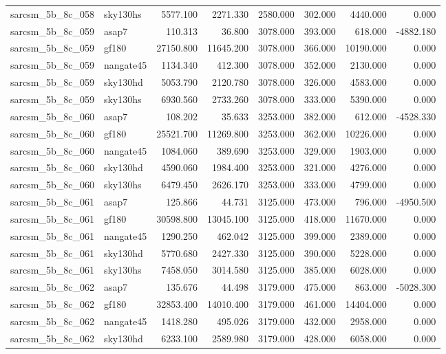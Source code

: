 \begin{tabular}{llrrrrrr}
sarcsm\_5b\_8c\_058 & sky130hs & 5577.100 & 2271.330 & 2580.000 & 302.000 & 4440.000 & 0.000 \\
sarcsm\_5b\_8c\_059 & asap7 & 110.313 & 36.800 & 3078.000 & 393.000 & 618.000 & -4882.180 \\
sarcsm\_5b\_8c\_059 & gf180 & 27150.800 & 11645.200 & 3078.000 & 366.000 & 10190.000 & 0.000 \\
sarcsm\_5b\_8c\_059 & nangate45 & 1134.340 & 412.300 & 3078.000 & 352.000 & 2130.000 & 0.000 \\
sarcsm\_5b\_8c\_059 & sky130hd & 5053.790 & 2120.780 & 3078.000 & 326.000 & 4583.000 & 0.000 \\
sarcsm\_5b\_8c\_059 & sky130hs & 6930.560 & 2733.260 & 3078.000 & 333.000 & 5390.000 & 0.000 \\
sarcsm\_5b\_8c\_060 & asap7 & 108.202 & 35.633 & 3253.000 & 382.000 & 612.000 & -4528.330 \\
sarcsm\_5b\_8c\_060 & gf180 & 25521.700 & 11269.800 & 3253.000 & 362.000 & 10226.000 & 0.000 \\
sarcsm\_5b\_8c\_060 & nangate45 & 1084.060 & 389.690 & 3253.000 & 329.000 & 1903.000 & 0.000 \\
sarcsm\_5b\_8c\_060 & sky130hd & 4590.060 & 1984.400 & 3253.000 & 321.000 & 4276.000 & 0.000 \\
sarcsm\_5b\_8c\_060 & sky130hs & 6479.450 & 2626.170 & 3253.000 & 333.000 & 4799.000 & 0.000 \\
sarcsm\_5b\_8c\_061 & asap7 & 125.866 & 44.731 & 3125.000 & 473.000 & 796.000 & -4950.500 \\
sarcsm\_5b\_8c\_061 & gf180 & 30598.800 & 13045.100 & 3125.000 & 418.000 & 11670.000 & 0.000 \\
sarcsm\_5b\_8c\_061 & nangate45 & 1290.250 & 462.042 & 3125.000 & 399.000 & 2389.000 & 0.000 \\
sarcsm\_5b\_8c\_061 & sky130hd & 5770.680 & 2427.330 & 3125.000 & 390.000 & 5228.000 & 0.000 \\
sarcsm\_5b\_8c\_061 & sky130hs & 7458.050 & 3014.580 & 3125.000 & 385.000 & 6028.000 & 0.000 \\
sarcsm\_5b\_8c\_062 & asap7 & 135.676 & 44.498 & 3179.000 & 475.000 & 863.000 & -5028.300 \\
sarcsm\_5b\_8c\_062 & gf180 & 32853.400 & 14010.400 & 3179.000 & 461.000 & 14404.000 & 0.000 \\
sarcsm\_5b\_8c\_062 & nangate45 & 1418.280 & 495.026 & 3179.000 & 432.000 & 2958.000 & 0.000 \\
sarcsm\_5b\_8c\_062 & sky130hd & 6233.100 & 2589.980 & 3179.000 & 428.000 & 6058.000 & 0.000 \\

\end{tabular}
